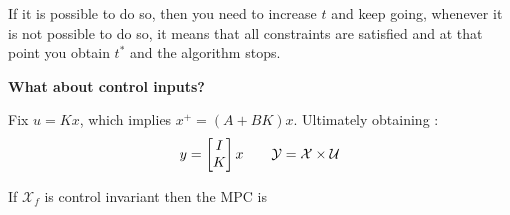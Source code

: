 If it is possible to do so, then you need to increase $t$ and keep going, whenever it is not possible to do so, it means that all constraints are satisfied and at that point you obtain $t^*$ and the algorithm stops.

\begin{center}
\textbf{What about control inputs?}
\end{center}


Fix $u= Kx$, which implies $x^+ = (A+BK)x$. Ultimately obtaining :
\[y = \begin{bmatrix}I\\K\end{bmatrix}x\qquad\mathcal{Y} = \mathcal{X}\times\mathcal{U}\]

\begin{theorem}
If $\mathcal{X}_f$ is control invariant then the MPC is 
\end{theorem}

